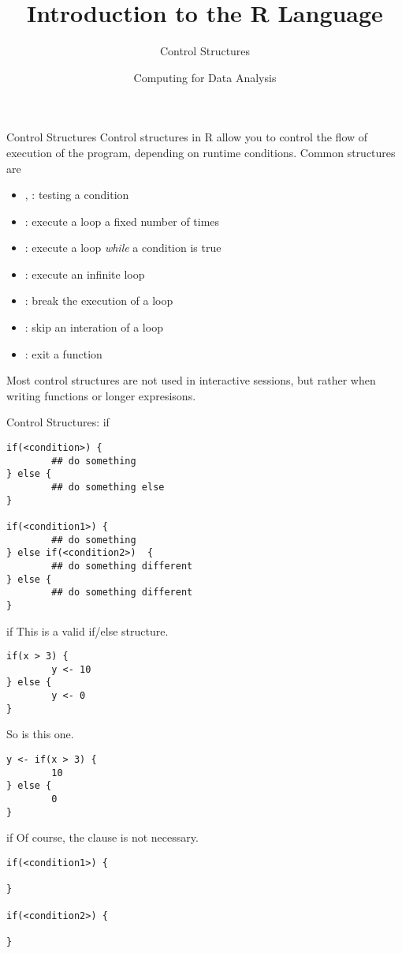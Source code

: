 \documentclass[aspectratio=169]{beamer}
\title[The R Language]{Introduction to the R Language}
\subtitle{Control Structures}
\date{Computing for Data Analysis}
\begin{document}
\begin{frame}
  \titlepage
\end{frame}

\begin{frame}{Control Structures}
Control structures in R allow you to control the flow of execution of
the program, depending on runtime conditions.  Common structures are
\begin{itemize}
\item
{}, : testing a condition
\item
{}: execute a loop a fixed number of times
\item
{}: execute a loop \textit{while} a condition is true
\item
{}:  execute an infinite loop
\item
{}: break the execution of a loop
\item
{}: skip an interation of a loop
\item
{}: exit a function
\end{itemize}
Most control structures are not used in interactive sessions, but
rather when writing functions or longer expresisons.
\end{frame}


\begin{frame}[fragile]{Control Structures: if}
\begin{verbatim}
if(<condition>) {
        ## do something
} else {
        ## do something else
}

if(<condition1>) {
        ## do something
} else if(<condition2>)  {
        ## do something different
} else {
        ## do something different
}
\end{verbatim}
\end{frame}

\begin{frame}[fragile]{if}
This is a valid if/else structure.
\begin{verbatim}
if(x > 3) {
        y <- 10
} else {
        y <- 0
}
\end{verbatim}
So is this one.
\begin{verbatim}
y <- if(x > 3) {
        10
} else {
        0
}
\end{verbatim}
\end{frame}

\begin{frame}[fragile]{if}
Of course, the  clause is not necessary.
\begin{verbatim}
if(<condition1>) {

}

if(<condition2>) {

}
\end{verbatim}
\end{frame}
\end{document}
